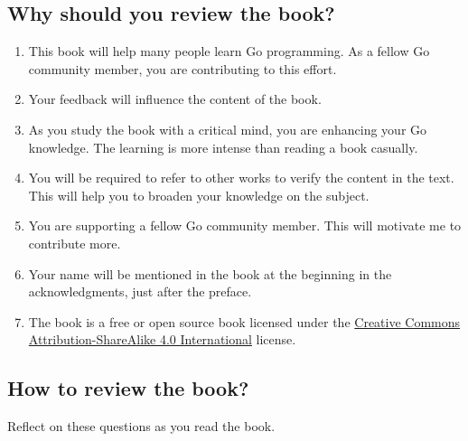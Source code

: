\subsection*{Why should you review the book?}

\begin{enumerate}

\item This book will help many people learn Go programming. As a fellow Go community member, you are contributing to this effort.

\item Your feedback will influence the content of the book.

\item As you study the book with a critical mind, you are enhancing your Go knowledge. The learning is more intense than reading a book casually.

\item You will be required to refer to other works to verify the content in the text. This will help you to broaden your knowledge on the subject.

\item You are supporting a fellow Go community member. This will motivate me to contribute more.

\item Your name will be mentioned in the book at the beginning in the acknowledgments, just after the preface.

\item The book is a free or open source book licensed under the \href{http://creativecommons.org/licenses/by-sa/4.0/}{Creative Commons Attribution-ShareAlike 4.0 International} license.

\end{enumerate}

\subsection*{How to review the book?}

Reflect on these questions as you read the book.

